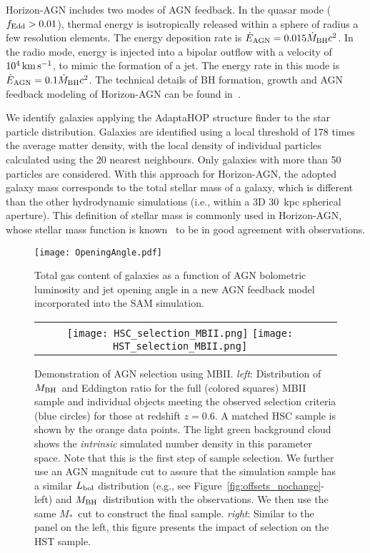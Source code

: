 \documentclass[twocolumn]{aastex631}
\def\smass{{$M_*$}}
\def\mbh{$M_{\rm BH}$}
\begin{document}
Horizon-AGN includes two modes of AGN feedback. In the quasar mode ($f_{\rm Edd}>0.01$), thermal energy is isotropically released within a sphere of radius a few resolution elements. The energy deposition rate is $\dot{E}_{\rm AGN} = 0.015 \dot{M}_{\rm BH} c^2$. In the radio mode, energy is injected into a bipolar  outflow  with  a  velocity  of  $10^4\,\rm km\,s^{-1}$, to  mimic the  formation  of  a  jet.  The  energy  rate  in  this  mode is $\dot{E}_{\rm AGN} = 0.1 \dot{M}_{\rm BH} c^2$.  The  technical  details  of  BH  formation,  growth  and AGN  feedback  modeling  of  Horizon-AGN  can be found in~\citet{2012MNRAS.420.2662D}.

We identify galaxies applying the AdaptaHOP structure finder \citep{Aubert+04,Tweed+09} to the star particle distribution.  Galaxies are identified using a local threshold of 178 times the average matter density, with the local density of individual particles calculated using the 20 nearest neighbours. Only galaxies with more than 50 particles are considered. With this approach for Horizon-AGN, the adopted galaxy mass corresponds to the total stellar mass of a galaxy, which is different than the other hydrodynamic simulations (i.e., within a 3D 30~kpc spherical aperture). This definition of stellar mass is commonly used in Horizon-AGN, whose stellar mass function is known~\citep{2017MNRAS.467.4739K} to be in good agreement with observations.



\begin{figure}
\centering
\texttt{[image: OpeningAngle.pdf]}
\caption{\label{fig:SAM} 
Total gas content of galaxies as a function of AGN bolometric luminosity and jet opening angle in a new AGN feedback model incorporated into the SAM simulation.
}
\end{figure} 

\begin{figure*}
\centering
\begin{tabular}{c c}
{\texttt{[image: HSC\_selection\_MBII.png]}}
{\texttt{[image: HST\_selection\_MBII.png]}}
\end{tabular}
\caption{\label{fig:selection}Demonstration of AGN selection using MBII. {\it left}: Distribution of \mbh\ and Eddington ratio for the full (colored squares) MBII sample and individual objects meeting the observed selection criteria (blue circles) for those at redshift $z=0.6$. A matched HSC sample is shown by the orange data points. The light green background cloud shows the {\it intrinsic} simulated number density in this parameter space. Note that this is the first step of sample selection. We further use an AGN magnitude cut to assure that the simulation sample has a similar $L_{\rm bol}$ distribution (e.g., see Figure~\ref{fig:offsets_nochange}-left) and \mbh\ distribution with the observations. We then use the same \smass\ cut to construct the final sample.
{\it right}: Similar to the panel on the left, this figure presents the impact of selection on the HST sample.
}
\end{figure*}
\end{document}
